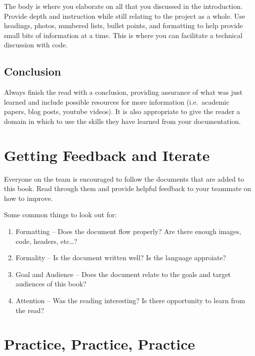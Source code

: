 \documentclass[]{book}
\begin{document}
The body is where you elaborate on all that you discussed in the introduction. Provide depth and instruction while still relating to the project as a whole. Use headings, photos, numbered lists, bullet points, and formatting to help provide small bits of information at a time. This is where you can facilitate a technical discussion with code.

\hypertarget{conclusion}{%
\subsection{Conclusion}\label{conclusion}}

Always finish the read with a conclusion, providing assurance of what was just learned and include possible resources for more information (i.e.~academic papers, blog posts, youtube videos). It is also appropriate to give the reader a domain in which to use the skills they have learned from your documentation.

\hypertarget{getting-feedback-and-iterate}{%
\section{Getting Feedback and Iterate}\label{getting-feedback-and-iterate}}

Everyone on the team is encouraged to follow the documents that are added to this book. Read through them and provide helpful feedback to your teammate on how to improve.

Some common things to look out for:

\begin{enumerate}
\def\labelenumi{\arabic{enumi}.}
\item
  Formatting -- Does the document flow properly? Are there enough images, code, headers, etc\ldots{}?
\item
  Formality -- Is the document written well? Is the language approiate?
\item
  Goal and Audience -- Does the document relate to the goals and target audiences of this book?
\item
  Attention -- Was the reading interesting? Is there opportunity to learn from the read?
\end{enumerate}

\hypertarget{practice-practice-practice}{%
\section{Practice, Practice, Practice}\label{practice-practice-practice}}
\end{document}
